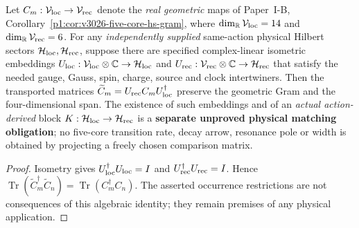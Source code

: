 \documentclass[12pt,a4paper]{article}
\begin{document}
\begin{proposition}
\label{p10:prop:v3026-five-core-physical-matching-gate}
Let $C_m:\mathcal V_{\rm loc}\to\mathcal V_{\rm rec}$ denote the
\emph{real geometric} maps of Paper~I-B,
Corollary~\ref{p1:cor:v3026-five-core-hs-gram}, where
$\dim_{\mathbb R}\mathcal V_{\rm loc}=14$ and
$\dim_{\mathbb R}\mathcal V_{\rm rec}=6$.
For any \emph{independently supplied} same-action physical Hilbert
sectors $\mathcal H_{\rm loc},\mathcal H_{\rm rec}$, suppose there
are specified complex-linear isometric embeddings
$U_{\rm loc}:\mathcal V_{\rm loc}\otimes\mathbb C\to
\mathcal H_{\rm loc}$ and
$U_{\rm rec}:\mathcal V_{\rm rec}\otimes\mathbb C\to
\mathcal H_{\rm rec}$ that satisfy the needed gauge, Gauss, spin,
charge, source and clock intertwiners. Then the transported matrices
$\widetilde C_m=U_{\rm rec}C_mU_{\rm loc}^\dagger$ preserve the
geometric Gram and the four-dimensional span.
The existence of such embeddings and of an \emph{actual action-derived}
block $K:\mathcal H_{\rm loc}\to\mathcal H_{\rm rec}$ is a
\textbf{separate unproved physical matching obligation}; no five-core
transition rate, decay arrow, resonance pole or width is obtained by
projecting a freely chosen comparison matrix.
\end{proposition}
\begin{proof}
Isometry gives
$U_{\rm loc}^\dagger U_{\rm loc}=I$ and
$U_{\rm rec}^\dagger U_{\rm rec}=I$. Hence
$\operatorname{Tr}(\widetilde C_m^\dagger\widetilde C_n)
=\operatorname{Tr}(C_m^\dagger C_n)$.
The asserted occurrence restrictions are not consequences of this
algebraic identity; they remain premises of any physical application.
\end{proof}
\end{document}
